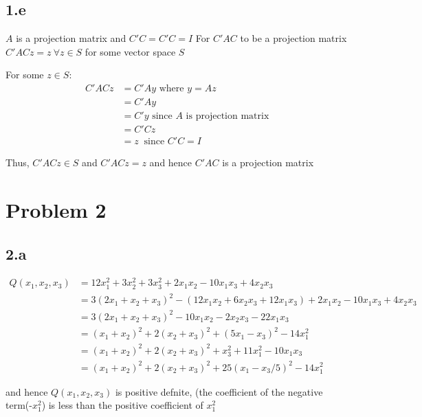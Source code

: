 \documentclass[a4paper]{article}
\begin{document}
\subsection*{1.e}
$A$ is a projection matrix and $C'C=C'C=I$
For $C'AC$ to be a projection matrix $C'ACz=z\ \forall z \in S$ for some vector space $S$

For some $z \in S$:
\begin{align*}
C'ACz &= C'Ay \text{ where } y=Az\\
&= C'Ay\\
&= C'y\text{ since $A$ is projection matrix }  \\
&= C'Cz\\
&= z\ \text{ since } C'C=I
\end{align*}

Thus, $C'ACz \in S$ and $C'ACz=z$ and hence $C'AC$ is a projection matrix

\section*{Problem 2}
\subsection*{2.a}

\begin{align*}
Q(x_1,x_2,x_3) &= 12x_1^2+3x_2^2+3x_3^2+2x_1x_2-10x_1x_3+4x_2x_3\\
&= 3(2x_1+x_2+x_3)^2-(12x_1x_2+6x_2x_3+12x_1x_3)+2x_1x_2-10x_1x_3+4x_2x_3\\
&= 3(2x_1+x_2+x_3)^2-10x_1x_2-2x_2x_3-22x_1x_3\\
&= (x_1+x_2)^2+ 2(x_2+x_3)^2+(5x_1-x_3)^2-14x_1^2\\
&=(x_1+x_2)^2+2(x_2+x_3)^2+x_3^2+11x_1^2-10x_1x_3\\
&= (x_1+x_2)^2+2(x_2+x_3)^2+25(x_1-x_3/5)^2-14x_1^2
\end{align*}

and hence $Q(x_1,x_2,x_3)$ is positive defnite, (the coefficient of the negative term(-$x_1^2$) is less than the positive coefficient of $x_1^2$
\end{document}
